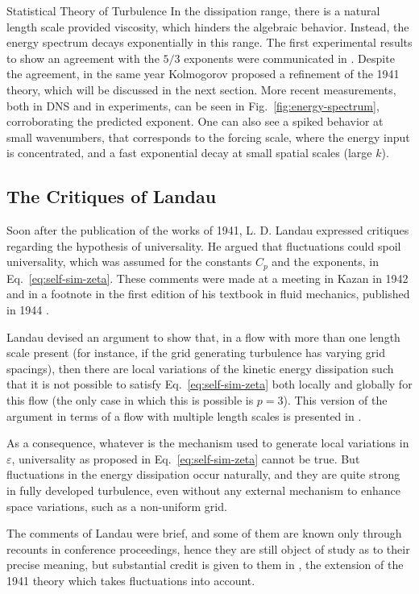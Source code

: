 \begin{chapter}{Statistical Theory of Turbulence}
In the dissipation range, there is a natural length scale provided
viscosity, which hinders the algebraic behavior. Instead, the
energy spectrum decays exponentially in this range.
The first experimental results to show an agreement with the $5/3$ exponents were communicated in \textcite{grant1962turbulence}.
Despite the agreement, in the same year Kolmogorov proposed
a refinement of the 1941 theory, which will be discussed in
the next section.
More recent measurements, both in DNS and in experiments, can be seen in
Fig.~\ref{fig:energy-spectrum}, corroborating the predicted exponent.
One can also see a spiked behavior at small wavenumbers, that
corresponds to the forcing scale, where the energy input is concentrated,
and a fast exponential decay at small spatial scales (large $k$).

\subsection{The Critiques of Landau} \label{sec:landau}

Soon after the publication of the works of 1941, L. D. Landau
expressed critiques regarding the hypothesis of universality.
He argued that fluctuations could spoil universality, which was assumed for the constants $C_p$ and the exponents, in Eq.~\eqref{eq:self-sim-zeta}.
These comments were made at a meeting in Kazan in 1942 and in a footnote
in the first edition of his textbook in fluid mechanics, published
in 1944 \parencite{frisch1995}.

Landau devised an argument to show that, in a flow with
more than one length scale present
(for instance, if the grid generating turbulence has varying grid
spacings), then there are local variations of the kinetic
energy dissipation such that it is not possible to
satisfy Eq.~\eqref{eq:self-sim-zeta} both locally and globally for this flow (the only case in which this is possible is $p=3$).
This version of the argument in terms of a flow with multiple length scales is presented in \textcite{frisch1995}.

As a consequence, whatever is the mechanism used to generate
local variations in $\varepsilon$, universality as proposed in Eq.~\eqref{eq:self-sim-zeta} cannot be true.
But fluctuations in the energy dissipation occur naturally,
and they are quite strong in fully developed turbulence,
even without any external mechanism
to enhance space variations, such as a non-uniform grid.

The comments of Landau were brief, and some of them are known only through recounts in conference proceedings, hence they are still object
of study as to their precise meaning, but substantial credit is given to them in \textcite{kolmogorov1962refinement}, the extension of the 1941 theory which takes fluctuations into account.


\end{chapter}
